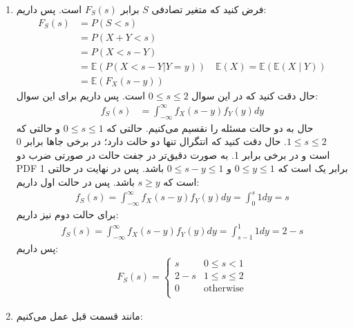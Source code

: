 \begin{enumerate}
    \item فرض کنید که  متغیر تصادفی $S$ برابر $F_S(s)$ است.
    پس داریم:
    \begin{align*}
        F_S(s) &= P(S < s)\\
        &= P(X + Y < s)\\
        &= P(X < s - Y)\\
        &= \mathbb{E}(P(X < s - Y | Y = y)) \quad \mathbb{E} (X) = \mathbb{E} ( \mathbb{E} ( X \mid Y))\\
        &= \mathbb{E}(F_X(s - y)) 
    \end{align*}
    حال دقت کنید که در این سوال
    $0 \le s \le 2$
    است.
    پس داریم برای این سوال:
    \begin{align*}
        f_S(s) & = \int_{-\infty}^\infty f_X(s-y)f_Y(y) dy
    \end{align*}
    حال به دو حالت مسئله را نقسیم می‌کنیم. حالتی که
    $0 \le s \le 1$
    و حالتی که 
    $1 \le s \le 2$.
    حال دقت کنید که انتگرال تنها دو حالت دارد؛ در برخی جا‌ها برابر 0 است و در برخی برابر 1.
    به صورت دقیق‌تر در جفت حالت در صورتی ضرب دو PDF برابر یک است که
    $0 \le y \le 1$
    و
    $0 \le s - y \le 1$
    باشد. پس در نهایت در حالتی 1 است که
    $s \ge y$
    باشد. پس در حالت اول داریم:
    \begin{gather*}
        f_S(s) = \int_{-\infty}^\infty f_X(s-y)f_Y(y) dy = \int_0^s 1 dy = s
    \end{gather*}
    برای حالت دوم نیز داریم:
    \begin{gather*}
        f_S(s) = \int_{-\infty}^\infty f_X(s-y)f_Y(y) dy = \int_{s - 1}^1 1 dy = 2 - s
    \end{gather*}
    پس داریم:
    \begin{gather*}
        F_S(s) =
            \begin{cases}
              s & 0 \le s < 1\\
              2 - s & 1 \le s \le 2\\
              0 & \text{otherwise}\\
            \end{cases}
    \end{gather*}
    \item مانند قسمت قبل عمل می‌کنیم:
    \begin{gather*}

\end{gather*}
\end{enumerate}
